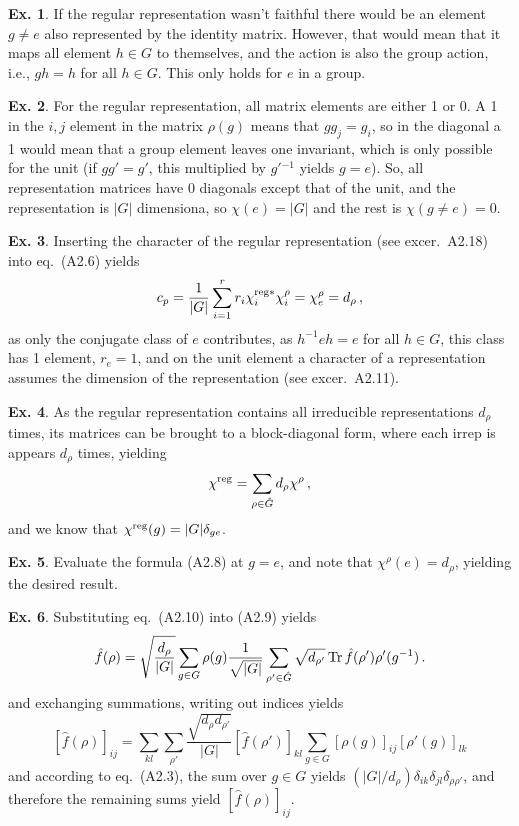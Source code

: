 \documentclass[a4paper,12pt]{article}
\def\Tr{\ensuremath{\mathop{\rm Tr}}{}}
\theoremstyle{definition}
\newtheorem{exercise}{Ex.}[section]
\begin{document}
\begin{exercise}
 If the regular representation wasn't faithful there would be an element $g\ne e$ also represented by the identity matrix. However, that would mean that it maps all element $h\in G$ to themselves, and the action is also the group action, i.e., $gh=h$ for all $h\in G$. This only holds for $e$ in a group.
\end{exercise}


\begin{exercise}
 For the regular representation, all matrix elements are either 1 or 0. A 1 in the $i,j$ element in the matrix $\rho(g)$ means that $g g_j = g_i$, so in the diagonal a 1 would mean that a group element leaves one invariant, which is only possible for the unit (if $g g' = g'$, this multiplied by $g'{}^{-1}$ yields $g=e$). So, all representation matrices have 0 diagonals except that of the unit, and the representation is $|G|$ dimensiona, so $\chi(e) = |G|$ and the rest is $\chi(g\ne e)=0$.
\end{exercise}

\begin{exercise}
 Inserting the character of the regular representation (see excer.\ A2.18) into eq.\ (A2.6) yields
 \[
  c_p = \frac{1}{|G|}\sum_{i=1}^{r} r_i \chi_i^{{\rm reg}*} \chi_i^\rho = \chi^\rho_e = d_\rho\,,
 \]
 as only the conjugate class of $e$ contributes, as $h^{-1}eh=e$ for all $h \in G$, this class has 1 element, $r_e=1$, and on the unit element a character of a representation assumes the dimension of the representation (see excer.\ A2.11).
\end{exercise}

\begin{exercise}
 As the regular representation contains all irreducible representations $d_\rho$ times, its matrices can be brought to a block-diagonal form, where each irrep is appears $d_\rho$ times, yielding
 \[
  \chi^{\rm reg} = \sum_{\rho \in \hat G} d_\rho \chi^\rho\,,
 \]
 and we know that $\chi^{\rm reg}(g) = |G| \delta_{ge}$.
\end{exercise}

\begin{exercise}
 Evaluate the formula (A2.8) at $g=e$, and note that $\chi^
 \rho (e) = d_\rho$, yielding the desired result.
\end{exercise}

\begin{exercise}
 Substituting eq.\ (A2.10) into (A2.9) yields
 \[
  \hat{f}(\rho) = \sqrt{\frac{d_\rho}{|G|}}\sum_{g\in G} \rho(g) \frac{1}{\sqrt{|G|}} \sum_{\rho'\in \hat G} \sqrt{d_{\rho'}} \Tr \hat{f}(\rho') \rho'(g^{-1})\,.
 \]
 and exchanging summations, writing out indices yields
 \[
  [\hat{f}(\rho)]_{ij} = \sum_{kl}\sum_{\rho'} \frac{\sqrt{d_\rho d_{\rho'}}}{|G|} [\hat{f}(\rho')]_{kl} \sum_{g\in G} [\rho(g)]_{ij}[\rho'(g)]_{lk}
 \]
 and according to eq.\ (A2.3), the sum over $g\in G$ yields $(|G|/d_{\rho}) \delta_{ik}\delta_{jl}\delta_{\rho\rho'}$, and therefore the remaining sums yield $[\hat{f}(\rho)]_{ij}$.
\end{exercise}
\end{document}
